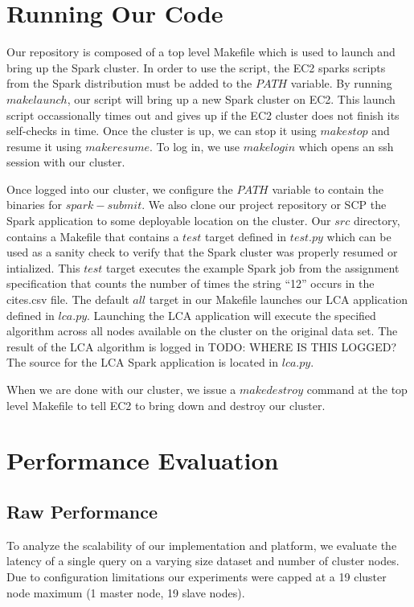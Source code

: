 \documentclass{article}
\begin{document}
\section{Running Our Code}

Our repository is composed of a top level Makefile which is used to launch and bring up the Spark cluster.
In order to use the script, the EC2 sparks scripts from the Spark distribution must be added to the $PATH$ variable.
By running $make launch$, our script will bring up a new Spark cluster on EC2.
This launch script occassionally times out and gives up if the EC2 cluster does not finish its self-checks in time.
Once the cluster is up, we can stop it using $make stop$ and resume it using $make resume$.
To log in, we use $make login$ which opens an ssh session with our cluster.

Once logged into our cluster, we configure the $PATH$ variable to contain the binaries for $spark-submit$.
We also clone our project repository or SCP the Spark application to some deployable location on the cluster.
Our $src$ directory, contains a Makefile that contains a $test$ target defined in $test.py$ which can be used as a sanity check to verify that the Spark cluster was properly resumed or intialized.
This $test$ target executes the example Spark job from the assignment specification that counts the number of times the string ``12'' occurs in the cites.csv file.
The default $all$ target in our Makefile launches our LCA application defined in $lca.py$.
Launching the LCA application will execute the specified algorithm across all nodes available on the cluster on the original data set.
The result of the LCA algorithm is logged in TODO: WHERE IS THIS LOGGED?
The source for the LCA Spark application is located in $lca.py$.

When we are done with our cluster, we issue a $make destroy$ command at the top level Makefile to tell EC2 to bring down and destroy our cluster.

\section{Performance Evaluation}

\subsection{Raw Performance}

To analyze the scalability of our implementation and platform, we evaluate the latency of a single query on a varying size dataset and number of cluster nodes.
Due to configuration limitations our experiments were capped at a 19 cluster node maximum (1 master node, 19 slave nodes).
\end{document}

